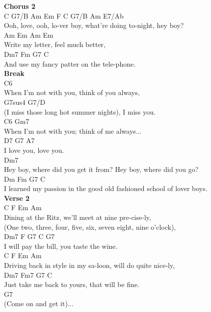 \documentclass[a4paper]{article}
\begin{document}
{{        }
        \textbf{Chorus 2}
        ~\\
        {
            \cutive
            \obeyspaces
C     G7/B  Am   Em F   C   G7/B              Am         E7/Ab
\\
 Ooh, love, ooh, lo-ver boy, what're doing to-night, hey boy?
\\
Am        Em      Am        Em
\\
 Write my letter, feel much better,
\\
    Dm7          Fm            G7   C
\\
And use my fancy patter on the tele-phone.
\\

        }
        \textbf{Break}
        ~\\
        {
            \cutive
            \obeyspaces
C6
\\
 When I'm not with you, think of you always,
\\
              G7sus4          G7/D
\\
(I miss those long hot summer nights), I miss you.
\\
C6                      Gm7
\\
 When I'm not with you; think of me always...
\\
  D7        G7   A7
\\
I love you, love you.
\\
Dm7
\\
 Hey boy, where did you get it from? Hey boy, where did you go?
\\
  Dm                        Fm                 G7              C
\\
I learned my passion in the good old fashioned school of lover boys.
\\

        }
        \textbf{Verse 2}
        ~\\
        {
            \cutive
            \obeyspaces
C                                  F        Em   Am
\\
 Dining at the Ritz, we'll meet at nine pre-cise-ly,
\\
(One two, three, four, five, six, seven eight, nine o'clock),
\\
Dm7             F         G7        C    G7
\\
 I will pay the bill, you taste the wine.
\\
C                               F                   Em   Am
\\
 Driving back in style in my sa-loon, will do quite nice-ly,
\\
     Dm7             Fm7         G7      C
\\
Just take me back to yours, that will be fine.
\\
             G7
\\
(Come on and get it)...
\\

}}
\end{document}
